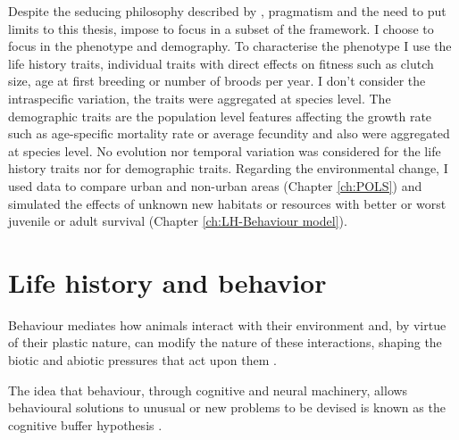 Despite the seducing philosophy described by \citet{levins1985}, pragmatism and
the need to put limits to this thesis, impose to focus in a subset of the
framework. I choose to focus in the phenotype and demography.
To characterise the phenotype I use the life history traits, individual traits
with direct effects on fitness such as clutch size, age at first breeding or
number of broods per year. I don't consider the intraspecific variation, the
traits were aggregated at species level.
The demographic traits are the population level features affecting
the growth rate such as age-specific mortality rate or average fecundity and
also were aggregated at species level. No evolution nor temporal variation was
considered for the life history traits nor for demographic traits.
Regarding the environmental change, I used data to compare urban and non-urban
areas (Chapter \ref{ch:POLS}) and simulated the effects of unknown new
habitats or resources with better or worst juvenile or adult survival (Chapter
\ref{ch:LH-Behaviour model}).


\section{Life history and behavior}

Behaviour mediates how animals interact with their environment and, by virtue
of their plastic nature, can modify the nature of these interactions, shaping
the biotic and abiotic pressures that act upon them
\citep{Futuyma1988,Losos2004}.

The idea that behaviour, through cognitive and neural machinery, allows
behavioural solutions to unusual or new problems to be devised is known as the
cognitive buffer hypothesis \citep{Allman1993,VanSchaik2003,Sol2009,Sol2009a}.


